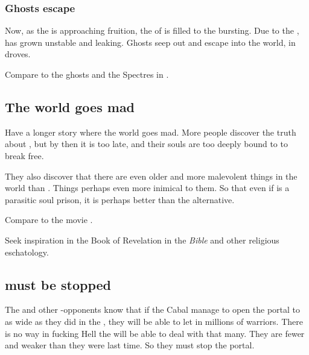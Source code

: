 \subsubsection{Ghosts escape}
Now, as the  is approaching fruition, the \carcer{} of \Iquin{} is filled to the bursting. 
Due to the , \Iquin{} has grown unstable and leaking. 
Ghosts seep out and escape into the world, in droves. 

Compare to the ghosts and the Spectres in \cite{PhillipPullman:HisDarkMaterials}. 









\subsection{The world goes mad}
Have a longer story where the world goes mad. 
More people discover the truth about \iquin, but by then it is too late, and their souls are too deeply bound to \iquin to break free. 

They also discover that there are even older and more malevolent things in the world than \iquin.
Things perhaps even more inimical to them.
So that even if \iquin is a parasitic soul prison, it is perhaps better than the alternative. 

Compare to the movie \cite{Movie:IntheMouthofMadness}. 


Seek inspiration in the Book of Revelation in the \emph{Bible} and other religious eschatology. 







\subsection{\Voidbringer must be stopped}
The \dragons{} and other \bane-opponents know that if the Cabal manage to open the portal to \Erebos{} as wide as they did in the \secondbanewar, they will be able to let in millions of \bane{} warriors. 
There is no way in fucking Hell the \Miithians will be able to deal with that many.
They are fewer and weaker than they were last time. 
So they must stop the portal. 








